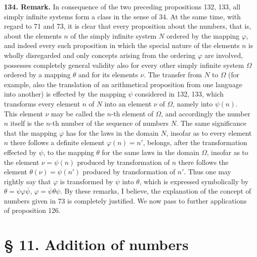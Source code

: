 \documentclass[11pt]{article}
\begin{document}
\noindent\textbf{134. Remark.} In consequence of the two preceding propositions 132, 133, all simply infinite systems form a class in the sense of 34. At the same time, with regard to 71 and 73, it is clear that every proposition about the numbers, that is, about the elements $n$ of the simply infinite system $N$ ordered by the mapping $\varphi$, and indeed every such proposition in which the special nature of the elements $n$ is wholly disregarded and only concepts arising from the ordering $\varphi$ are involved, possesses completely general validity also for every other simply infinite system $\Omega$ ordered by a mapping $\theta$ and for its elements $\nu$. The transfer from $N$ to $\Omega$ (for example, also the translation of an arithmetical proposition from one language into another) is effected by the mapping $\psi$ considered in 132, 133, which transforms every element $n$ of $N$ into an element $\nu$ of $\Omega$, namely into $\psi(n)$. This element $\nu$ may be called the $n$-th element of $\Omega$, and accordingly the number $n$ itself is the $n$-th number of the sequence of numbers $N$. The same significance that the mapping $\varphi$ has for the laws in the domain $N$, insofar as to every element $n$ there follows a definite element $\varphi(n)=n'$, belongs, after the transformation effected by $\psi$, to the mapping $\theta$ for the same laws in the domain $\Omega$, insofar as to the element $\nu=\psi(n)$ produced by transformation of $n$ there follows the element $\theta(\nu)=\psi(n')$ produced by transformation of $n'$. Thus one may rightly say that $\varphi$ is transformed by $\psi$ into $\theta$, which is expressed symbolically by $\theta=\psi\varphi\overline{\psi}$, $\varphi=\overline{\psi}\theta\psi$. By these remarks, I believe, the explanation of the concept of numbers given in 73 is completely justified. We now pass to further applications of proposition 126.

\section*{§ 11. Addition of numbers}
\end{document}
